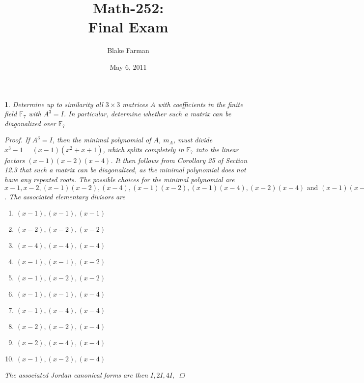 \documentclass[10pt]{amsart}
\author{Blake Farman}
\title{Math-252:\\Final Exam}
\date{May 6, 2011}
\begin{document}
\maketitle

\newtheorem{thm}{}
\newcommand{\F}{\mathbb{F}}
\begin{thm}
  \label{Ex1}
  Determine up to similarity all $3 \times 3$ matrices $A$ with coefficients in the finite field $\F_7$ with $A^3 = I$.
  In particular, determine whether such a matrix can be diagonalized over $\F_7$
  
  \begin{proof}
    If $A^3 = I$, then the minimal polynomial of $A$, $m_A$, must divide $x^3 - 1 = (x-1)(x^2 + x + 1)$, which splits completely in $\F_7$ into the linear factors $(x-1)(x-2)(x-4)$.
    It then follows from Corollary 25 of Section 12.3 that such a matrix can be diagonalized, as the minimal polynomial does not have any repeated roots.
    The possible choices for the minimal polynomial are $x-1, x-2, (x-1)(x-2), (x-4), (x-1)(x-2), (x-1)(x-4), (x-2)(x-4) \text{ and } (x-1)(x-2)(x-4)$.
    The associated elementary divisors are
    \begin{enumerate}
    \item
      $(x-1),(x-1),(x-1)$
    \item
      $(x-2),(x-2),(x-2)$
    \item
      $(x-4),(x-4),(x-4)$
    \item
      $(x-1),(x-1),(x-2)$
    \item
      $(x-1),(x-2),(x-2)$
    \item
      $(x-1),(x-1),(x-4)$
    \item
      $(x-1),(x-4),(x-4)$
    \item
      $(x-2),(x-2),(x-4)$
    \item
      $(x-2),(x-4),(x-4)$
    \item
      $(x-1),(x-2),(x-4)$
    \end{enumerate}
    The associated Jordan canonical forms are then $I, 2I, 4I,$ 
  

\end{proof}
\end{thm}
\end{document}
